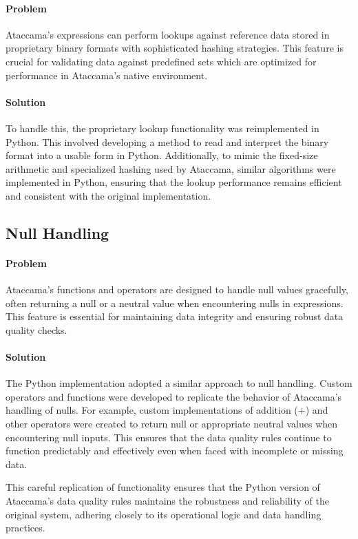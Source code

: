 \paragraph{Problem}

Ataccama's expressions can perform lookups against reference data stored in proprietary binary formats with sophisticated hashing strategies. This feature is crucial for validating data against predefined sets which are optimized for performance in Ataccama's native environment.
\paragraph{Solution}

To handle this, the proprietary lookup functionality was reimplemented in Python. This involved developing a method to read and interpret the binary format into a usable form in Python. Additionally, to mimic the fixed-size arithmetic and specialized hashing used by Ataccama, similar algorithms were implemented in Python, ensuring that the lookup performance remains efficient and consistent with the original implementation.
\subsection{Null Handling}
\paragraph{Problem}

Ataccama's functions and operators are designed to handle null values gracefully, often returning a null or a neutral value when encountering nulls in expressions. This feature is essential for maintaining data integrity and ensuring robust data quality checks.
\paragraph{Solution}

The Python implementation adopted a similar approach to null handling. Custom operators and functions were developed to replicate the behavior of Ataccama's handling of nulls. For example, custom implementations of addition (+) and other operators were created to return null or appropriate neutral values when encountering null inputs. This ensures that the data quality rules continue to function predictably and effectively even when faced with incomplete or missing data.

This careful replication of functionality ensures that the Python version of Ataccama's data quality rules maintains the robustness and reliability of the original system, adhering closely to its operational logic and data handling practices.

